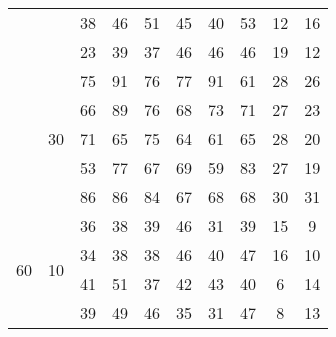 \begin{table}[h]
\begin{tabular}{cc|c|c|c|c|c|c|c|c|}
\multicolumn{1}{|c|}{}                     &                     & 38              & 46            & 51              & 45            & 40              & 53            & 12              & 16            \\ \cline{3-10} 
\multicolumn{1}{|c|}{}                     &                     & 23              & 39            & 37              & 46            & 46              & 46            & 19              & 12            \\ \cline{2-10} 
\multicolumn{1}{|c|}{}                     & \multirow{5}{*}{30} & 75              & 91            & 76              & 77            & 91              & 61            & 28              & 26            \\ \cline{3-10} 
\multicolumn{1}{|c|}{}                     &                     & 66              & 89            & 76              & 68            & 73              & 71            & 27              & 23            \\ \cline{3-10} 
\multicolumn{1}{|c|}{}                     &                     & 71              & 65            & 75              & 64            & 61              & 65            & 28              & 20            \\ \cline{3-10} 
\multicolumn{1}{|c|}{}                     &                     & 53              & 77            & 67              & 69            & 59              & 83            & 27              & 19            \\ \cline{3-10} 
\multicolumn{1}{|c|}{}                     &                     & 86              & 86            & 84              & 67            & 68              & 68            & 30              & 31            \\ \hline
\multicolumn{1}{|c|}{\multirow{15}{*}{60}} & \multirow{5}{*}{10} & 36              & 38            & 39              & 46            & 31              & 39            & 15              & 9             \\ \cline{3-10} 
\multicolumn{1}{|c|}{}                     &                     & 34              & 38            & 38              & 46            & 40              & 47            & 16              & 10            \\ \cline{3-10} 
\multicolumn{1}{|c|}{}                     &                     & 41              & 51            & 37              & 42            & 43              & 40            & 6               & 14            \\ \cline{3-10} 
\multicolumn{1}{|c|}{}                     &                     & 39              & 49            & 46              & 35            & 31              & 47            & 8               & 13            \\ \cline{3-10} 

\end{tabular}
\end{table}
